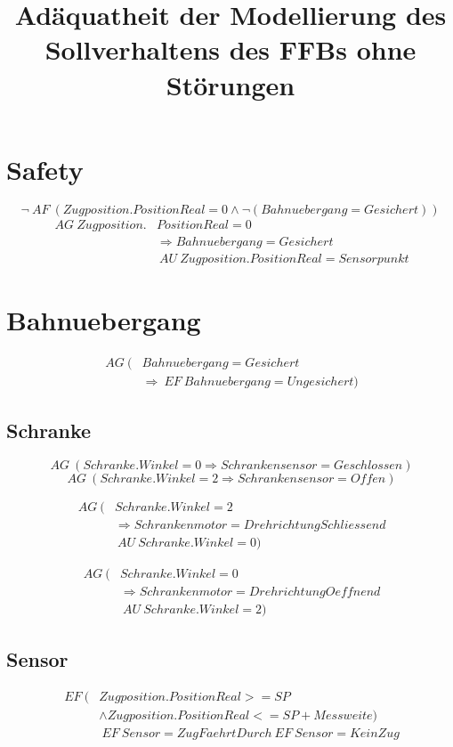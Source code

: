 \documentclass[12pt,a4paper,draft]{article}
\begin{document}
\title{Adäquatheit der Modellierung des Sollverhaltens des FFBs ohne Störungen}


\newcommand{\AF}{\ AF\ }
\newcommand{\AG}{\ AG\ }
\newcommand{\AU}{\ AU\ }
\newcommand{\EF}{\ EF\ }
\newcommand{\EU}{\ EU\ }
\newcommand{\myeq}[1]{%
\begin{equation}
\begin{split}
#1
\end{split}
\end{equation}
}



\section{Safety} 
\begin{equation}
\neg \AF (Zugposition.PositionReal = 0 \land \neg (Bahnuebergang = Gesichert))
\end{equation}
\myeq{
\AG Zugposition.&PositionReal = 0 \\
	& \Rightarrow Bahnuebergang = Gesichert \\
	& \AU Zugposition.PositionReal = Sensorpunkt
}

\section{Bahnuebergang}
\myeq{
\AG (&Bahnuebergang = Gesichert \\
	& \Rightarrow \EF Bahnuebergang = Ungesichert)
}

\subsection{Schranke}
\begin{equation}
\AG (Schranke.Winkel = 0 \Rightarrow Schrankensensor = Geschlossen)
\end{equation}
\begin{equation}
\AG (Schranke.Winkel = 2 \Rightarrow Schrankensensor = Offen)
\end{equation}

\myeq{
\AG (&Schranke.Winkel = 2 \\
	& \Rightarrow Schrankenmotor = DrehrichtungSchliessend \\
	& \AU Schranke.Winkel = 0)
}
\myeq{
\AG (&Schranke.Winkel = 0 \\
	& \Rightarrow Schrankenmotor = DrehrichtungOeffnend \\
	& \AU Schranke.Winkel = 2)
}

\subsection{Sensor}
\myeq{
\EF (&Zugposition.PositionReal >= SP \\
	& \land Zugposition.PositionReal <= SP + Messweite) \\
	& \EF Sensor = ZugFaehrtDurch \EF Sensor = KeinZug
}
\end{document}
